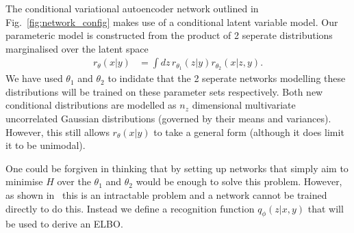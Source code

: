 \documentclass[%
showpacs,
 amsmath,amssymb,
 aps,
 twocolumn,
 prl,
 reprint,
floatfix,
]{revtex4-1}
\begin{document}
The conditional variational autoencoder network outlined in
Fig.~\ref{fig:network_config} makes use of a conditional latent variable model.
Our parameteric model is constructed from the product of 2 seperate
distributions marginalised over the latent space
%
\begin{align}\label{eq:latent_model}
r_{\theta}(x|y) &= \int dz\,r_{\theta_{1}}(z|y)r_{\theta_{2}}(x|z,y).
\end{align}
%  
We have used $\theta_{1}$ and $\theta_{2}$ to indidate that the 2 seperate
networks modelling these distributions will be trained on these parameter sets
respectively. Both new conditional distributions are modelled as $n_{z}$
dimensional multivariate uncorrelated Gaussian distributions (governed by their
means and variances). However, this still allows $r_{\theta}(x|y)$ to take a
general form (although it does limit it to be unimodal).  

One could be forgiven in thinking that by setting up networks that simply aim
to minimise $H$ over the $\theta_{1}$ and $\theta_{2}$ would be enough to solve
this problem. However, as shown in~\cite{NIPS2015_5775} this is an intractable
problem and a network cannot be trained directly to do this. Instead we define
a recognition function $q_{\phi}(z|x,y)$ that will be used to derive an
\ac{ELBO}.
\end{document}
